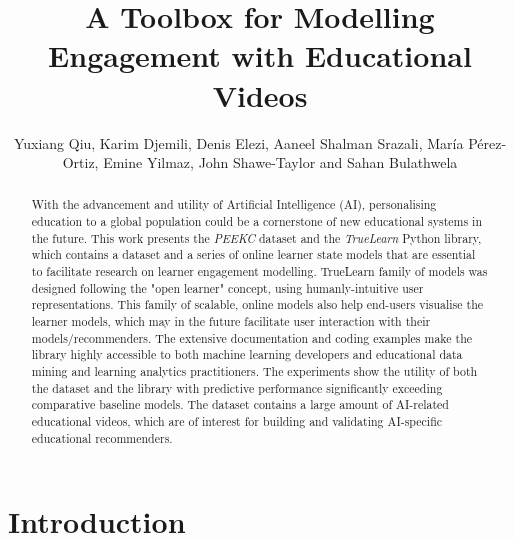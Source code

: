 \documentclass[letterpaper]{article} %
\title{A Toolbox for Modelling Engagement with Educational Videos}
\author{
Yuxiang Qiu\equalcontrib,
Karim Djemili\equalcontrib,
Denis Elezi\equalcontrib,
Aaneel Shalman Srazali\equalcontrib,
Mar\'ia P\'erez-Ortiz,
Emine Yilmaz,
John Shawe-Taylor and
Sahan Bulathwela
}
\begin{document}
\maketitle

\begin{abstract}
With the advancement and utility of Artificial Intelligence (AI), personalising education to a global population could be a cornerstone of new educational systems in the future. This work presents the \emph{PEEKC} dataset and the \emph{TrueLearn} Python library, which contains a dataset and a series of online learner state models that are essential to facilitate research on learner engagement modelling. %
TrueLearn family of models was designed following the "open learner" concept, using humanly-intuitive user representations.
This family of scalable, online models also help
end-users visualise the learner models, which may in the future facilitate user interaction with their models/recommenders.
The extensive documentation and coding examples make the library highly accessible to both machine learning developers and educational data mining and learning analytics practitioners.
The experiments show the utility of both the dataset and the library with predictive performance significantly exceeding comparative baseline models. The dataset contains a large amount of AI-related educational videos, which are of interest for building and validating AI-specific educational recommenders.
\end{abstract}

\section{Introduction}
\end{document}
